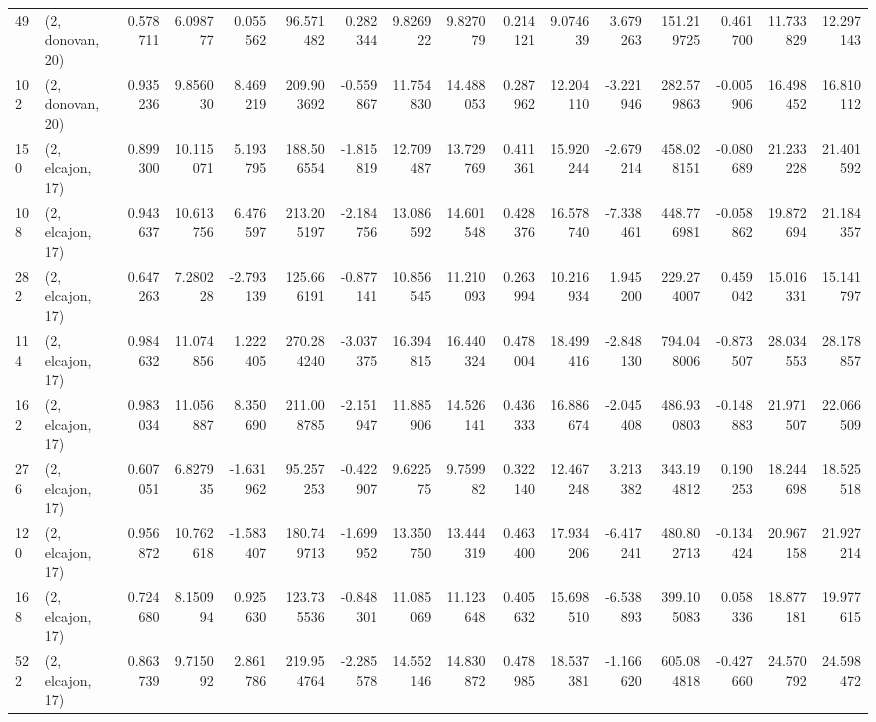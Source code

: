 \begin{tabular}{llrrrrrrrrrrrrrr}
49  &  (2, donovan, 20) &   0.578711 &   6.098777 &   0.055562 &    96.571482 &   0.282344 &   9.826922 &   9.827079 &  0.214121 &   9.074639 &   3.679263 &    151.219725 &   0.461700 &  11.733829 &   12.297143 \\
102 &  (2, donovan, 20) &   0.935236 &   9.856030 &   8.469219 &   209.903692 &  -0.559867 &  11.754830 &  14.488053 &  0.287962 &  12.204110 &  -3.221946 &    282.579863 &  -0.005906 &  16.498452 &   16.810112 \\
150 &  (2, elcajon, 17) &   0.899300 &  10.115071 &   5.193795 &   188.506554 &  -1.815819 &  12.709487 &  13.729769 &  0.411361 &  15.920244 &  -2.679214 &    458.028151 &  -0.080689 &  21.233228 &   21.401592 \\
108 &  (2, elcajon, 17) &   0.943637 &  10.613756 &   6.476597 &   213.205197 &  -2.184756 &  13.086592 &  14.601548 &  0.428376 &  16.578740 &  -7.338461 &    448.776981 &  -0.058862 &  19.872694 &   21.184357 \\
282 &  (2, elcajon, 17) &   0.647263 &   7.280228 &  -2.793139 &   125.666191 &  -0.877141 &  10.856545 &  11.210093 &  0.263994 &  10.216934 &   1.945200 &    229.274007 &   0.459042 &  15.016331 &   15.141797 \\
114 &  (2, elcajon, 17) &   0.984632 &  11.074856 &   1.222405 &   270.284240 &  -3.037375 &  16.394815 &  16.440324 &  0.478004 &  18.499416 &  -2.848130 &    794.048006 &  -0.873507 &  28.034553 &   28.178857 \\
162 &  (2, elcajon, 17) &   0.983034 &  11.056887 &   8.350690 &   211.008785 &  -2.151947 &  11.885906 &  14.526141 &  0.436333 &  16.886674 &  -2.045408 &    486.930803 &  -0.148883 &  21.971507 &   22.066509 \\
276 &  (2, elcajon, 17) &   0.607051 &   6.827935 &  -1.631962 &    95.257253 &  -0.422907 &   9.622575 &   9.759982 &  0.322140 &  12.467248 &   3.213382 &    343.194812 &   0.190253 &  18.244698 &   18.525518 \\
120 &  (2, elcajon, 17) &   0.956872 &  10.762618 &  -1.583407 &   180.749713 &  -1.699952 &  13.350750 &  13.444319 &  0.463400 &  17.934206 &  -6.417241 &    480.802713 &  -0.134424 &  20.967158 &   21.927214 \\
168 &  (2, elcajon, 17) &   0.724680 &   8.150994 &   0.925630 &   123.735536 &  -0.848301 &  11.085069 &  11.123648 &  0.405632 &  15.698510 &  -6.538893 &    399.105083 &   0.058336 &  18.877181 &   19.977615 \\
522 &  (2, elcajon, 17) &   0.863739 &   9.715092 &   2.861786 &   219.954764 &  -2.285578 &  14.552146 &  14.830872 &  0.478985 &  18.537381 &  -1.166620 &    605.084818 &  -0.427660 &  24.570792 &   24.598472 \\

\end{tabular}
